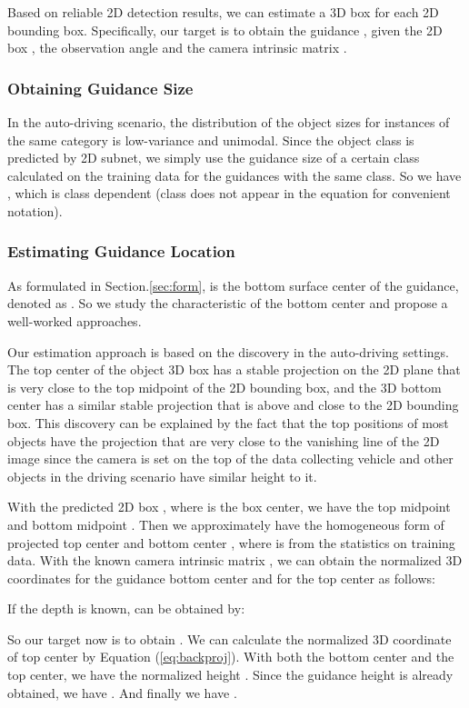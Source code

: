 \documentclass[10pt,twocolumn,letterpaper]{article}
\begin{document}
Based on reliable 2D detection results, we can estimate a 3D box for each 2D bounding box. 
Specifically, our target is to obtain the guidance , given the 2D box , the observation angle  and the camera intrinsic matrix .

\subsubsection{Obtaining Guidance Size }
In the auto-driving scenario, the distribution of the object sizes for instances of the same category is low-variance and unimodal. Since the object class is predicted by 2D subnet, we simply use the guidance size  of a certain class calculated on the training data for the guidances with the same class. So we have , which is class dependent (class does not appear in the equation for convenient notation).

\subsubsection{Estimating Guidance Location }
As formulated in Section.\ref{sec:form},  is the bottom surface center of the guidance, denoted as . So we study the characteristic of the bottom center and propose a well-worked approaches.

Our estimation approach is based on the discovery in the auto-driving settings. The top center of the object 3D box has a stable projection on the 2D plane that is very close to the top midpoint of the 2D bounding box, and the 3D bottom center has a similar stable projection that is above and close to the 2D bounding box. This discovery can be explained by the fact that the top positions of most objects have the projection that are very close to the vanishing line of the 2D image since the camera is set on the top of the data collecting vehicle and other objects in the driving scenario have similar height to it.

With the predicted 2D box , where  is the box center, we have the top midpoint  and bottom midpoint .
Then we approximately have the homogeneous form of projected top center  and bottom center , where  is from the statistics on training data.
With the known camera intrinsic matrix , we can obtain the normalized 3D coordinates  for the guidance bottom center  and  for the top center  as follows:


If the depth  is known,  can be obtained by:


So our target now is to obtain .
We can calculate the normalized 3D coordinate of top center  by Equation (\ref{eq:backproj}). With both the bottom center and the top center, we have the normalized height . Since the guidance height  is already obtained, we have . And finally we have .
\end{document}
